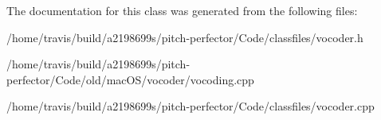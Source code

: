 The documentation for this class was generated from the following files\-:\begin{DoxyCompactItemize}
\item 
/home/travis/build/a2198699s/pitch-\/perfector/\-Code/classfiles/vocoder.\-h\item 
/home/travis/build/a2198699s/pitch-\/perfector/\-Code/old/mac\-O\-S/vocoder/vocoding.\-cpp\item 
/home/travis/build/a2198699s/pitch-\/perfector/\-Code/classfiles/vocoder.\-cpp\end{DoxyCompactItemize}
